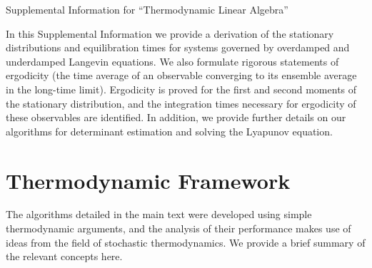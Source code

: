 \documentclass[prx,onecolumn,floatfix,longbibliography,notitlepage, nofootinbib]{revtex4-1}
\begin{document}



\pagebreak

\begin{appendix}


\begin{center}
\Large Supplemental Information for ``Thermodynamic Linear Algebra''
\end{center}



In this Supplemental Information we provide a derivation of the stationary distributions and equilibration times for systems governed by overdamped and underdamped Langevin equations. We also formulate rigorous statements of ergodicity (the time average of an observable converging to its ensemble average in the long-time limit). Ergodicity is proved for the first and second moments of the stationary distribution, and the integration times necessary for ergodicity of these observables are identified. In addition, we provide further details on our algorithms for determinant estimation and solving the Lyapunov equation.







\section{Thermodynamic Framework}

The algorithms detailed in the main text were developed using simple thermodynamic arguments, and the analysis of their performance makes use of ideas from the field of stochastic thermodynamics. We provide a brief summary of the relevant concepts here.



\end{appendix}
\end{document}

